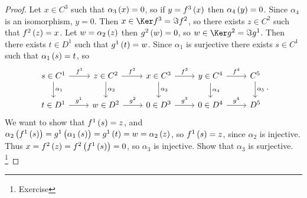 \begin{proof}
Let $ x \in C^3 $ such that $ \alpha_3\br{x} = 0 $, so if $ y = f^3\br{x} $ then $ \alpha_4\br{y} = 0 $. Since $ \alpha_4 $ is an isomorphism, $ y = 0 $. Then $ x \in \Ker f^3 = \Im f^2 $, so there exists $ z \in C^2 $ such that $ f^2\br{z} = x $. Let $ w = \alpha_2\br{z} $ then $ g^2\br{w} = 0 $, so $ w \in \Ker g^2 = \Im g^1 $. Then there exists $ t \in D^1 $ such that $ g^1\br{t} = w $. Since $ \alpha_1 $ is surjective there exists $ s \in C^1 $ such that $ \alpha_1\br{s} = t $, so
$$
\begin{tikzcd}
s \in C^1 \arrow{r}{f^1} \arrow{d}{\alpha_1} & z \in C^2 \arrow{r}{f^2} \arrow{d}{\alpha_2} & x \in C^3 \arrow{r}{f^3} \arrow{d}{\alpha_3} & y \in C^4 \arrow{r}{f^4} \arrow{d}{\alpha_4} & C^5 \arrow{d}{\alpha_5} \\
t \in D^1 \arrow{r}{g^1} & w \in D^2 \arrow{r}{g^2} & 0 \in D^3 \arrow{r}{g^3} & 0 \in D^4 \arrow{r}{g^4} & D^5
\end{tikzcd}.
$$
We want to show that $ f^1\br{s} = z $, and $ \alpha_2\br{f^1\br{s}} = g^1\br{\alpha_1\br{s}} = g^1\br{t} = w = \alpha_2\br{z} $, so $ f^1\br{s} = z $, since $ \alpha_2 $ is injective. Thus $ x = f^2\br{z} = f^2\br{f^1\br{s}} = 0 $, so $ \alpha_3 $ is injective. Show that $ \alpha_3 $ is surjective. \footnote{Exercise}
\end{proof}

\pagebreak


